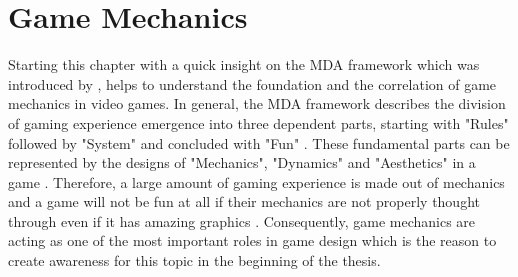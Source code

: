 \documentclass[MGS,Master,english]{twbook}%
\begin{document}
%
%
\clearpage
\chapter{Game Mechanics}
Starting this chapter with a quick insight on the \ac{MDA} framework which was introduced by \cite{mechanic::MDA}, helps to understand the foundation and the correlation of game mechanics in video games. In general, the MDA framework describes the division of gaming experience emergence into three dependent parts, starting with "Rules" followed by "System" and concluded with "Fun" \cite{mechanic::MDA}. These fundamental parts can be represented by the designs of "Mechanics", "Dynamics" and "Aesthetics" in a game  \cite{mechanic::MDA}. Therefore, a large amount of gaming experience is made out of mechanics and a game will not be fun at all if their mechanics are not properly thought through even if it has amazing graphics \cite{gameDesign::gameMechanicsAdvancedGameDesign}. Consequently, game mechanics are acting as one of the most important roles in game design which is the reason to create awareness for this topic in the beginning of the thesis.  
\end{document}
